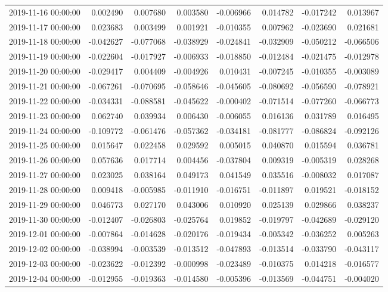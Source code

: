 \begin{tabular}{lrrrrrrr}
2019-11-16 00:00:00 & 0.002490 & 0.007680 & 0.003580 & -0.006966 & 0.014782 & -0.017242 & 0.013967 \\
2019-11-17 00:00:00 & 0.023683 & 0.003499 & 0.001921 & -0.010355 & 0.007962 & -0.023690 & 0.021681 \\
2019-11-18 00:00:00 & -0.042627 & -0.077068 & -0.038929 & -0.024841 & -0.032909 & -0.050212 & -0.066506 \\
2019-11-19 00:00:00 & -0.022604 & -0.017927 & -0.006933 & -0.018850 & -0.012484 & -0.021475 & -0.012978 \\
2019-11-20 00:00:00 & -0.029417 & 0.004409 & -0.004926 & 0.010431 & -0.007245 & -0.010355 & -0.003089 \\
2019-11-21 00:00:00 & -0.067261 & -0.070695 & -0.058646 & -0.045605 & -0.080692 & -0.056590 & -0.078921 \\
2019-11-22 00:00:00 & -0.034331 & -0.088581 & -0.045622 & -0.000402 & -0.071514 & -0.077260 & -0.066773 \\
2019-11-23 00:00:00 & 0.062740 & 0.039934 & 0.006430 & -0.006055 & 0.016136 & 0.031789 & 0.016495 \\
2019-11-24 00:00:00 & -0.109772 & -0.061476 & -0.057362 & -0.034181 & -0.081777 & -0.086824 & -0.092126 \\
2019-11-25 00:00:00 & 0.015647 & 0.022458 & 0.029592 & 0.005015 & 0.040870 & 0.015594 & 0.036781 \\
2019-11-26 00:00:00 & 0.057636 & 0.017714 & 0.004456 & -0.037804 & 0.009319 & -0.005319 & 0.028268 \\
2019-11-27 00:00:00 & 0.023025 & 0.038164 & 0.049173 & 0.041549 & 0.035516 & -0.008032 & 0.017087 \\
2019-11-28 00:00:00 & 0.009418 & -0.005985 & -0.011910 & -0.016751 & -0.011897 & 0.019521 & -0.018152 \\
2019-11-29 00:00:00 & 0.046773 & 0.027170 & 0.043006 & 0.010920 & 0.025139 & 0.029866 & 0.038237 \\
2019-11-30 00:00:00 & -0.012407 & -0.026803 & -0.025764 & 0.019852 & -0.019797 & -0.042689 & -0.029120 \\
2019-12-01 00:00:00 & -0.007864 & -0.014628 & -0.020176 & -0.019434 & -0.005342 & -0.036252 & 0.005263 \\
2019-12-02 00:00:00 & -0.038994 & -0.003539 & -0.013512 & -0.047893 & -0.013514 & -0.033790 & -0.043117 \\
2019-12-03 00:00:00 & -0.023622 & -0.012392 & -0.000998 & -0.023489 & -0.010375 & 0.014218 & -0.016577 \\
2019-12-04 00:00:00 & -0.012955 & -0.019363 & -0.014580 & -0.005396 & -0.013569 & -0.044751 & -0.004020 \\

\end{tabular}
